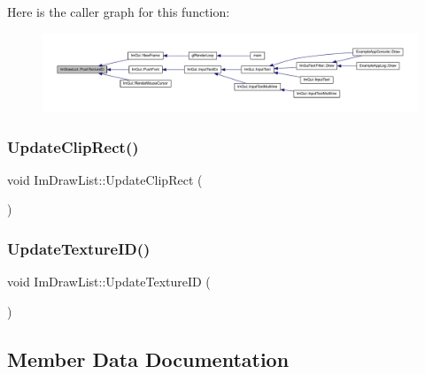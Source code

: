 Here is the caller graph for this function\+:
\nopagebreak
\begin{figure}[H]
\begin{center}
\leavevmode
\includegraphics[width=350pt]{struct_im_draw_list_a7ac41e329a9df911b4823ef0150cee16_icgraph}
\end{center}
\end{figure}
\mbox{\label{struct_im_draw_list_a5978db1fc49be781978699e85c6a3251}} 
\subsubsection{\texorpdfstring{Update\+Clip\+Rect()}{UpdateClipRect()}}
{\footnotesize\ttfamily void Im\+Draw\+List\+::\+Update\+Clip\+Rect (\begin{DoxyParamCaption}{ }\end{DoxyParamCaption})}

\mbox{\label{struct_im_draw_list_a58998853ed37538ae5a638da032b0005}} 
\subsubsection{\texorpdfstring{Update\+Texture\+I\+D()}{UpdateTextureID()}}
{\footnotesize\ttfamily void Im\+Draw\+List\+::\+Update\+Texture\+ID (\begin{DoxyParamCaption}{ }\end{DoxyParamCaption})}



\subsection{Member Data Documentation}
\mbox{\label{struct_im_draw_list_ae6be941728e5b2c81a03c78e4aa22629}} 
